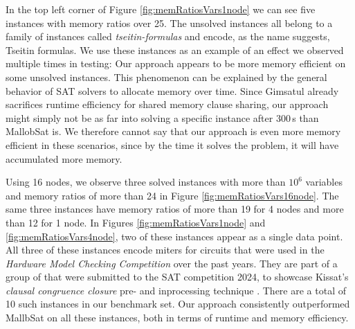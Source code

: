 \documentclass[12pt,a4paper,twoside]{scrartcl}
\numberwithin{equation}{section}
\begin{document}
In the top left corner of Figure \ref{fig:memRatiosVars1node} we can see five instances with memory ratios over 25. The unsolved instances all belong to a family of instances called \textit{tseitin-formulas} and encode, as the name suggests, Tseitin formulas. We use these instances as an example of an effect we observed multiple times in testing: Our approach appears to be more memory efficient on some unsolved instances. This phenomenon can be explained by the general behavior of SAT solvers to allocate memory over time. Since Gimsatul already sacrifices runtime efficiency for shared memory clause sharing, our approach might simply not be as far into solving a specific instance after $300\,$s than MallobSat is. We therefore cannot say that our approach is even more memory efficient in these scenarios, since by the time it solves the problem, it will have accumulated more memory.

Using 16 nodes, we observe three solved instances with more than $10^6$ variables and memory ratios of more than 24 in Figure \ref{fig:memRatiosVars16node}. The same three instances have memory ratios of more than 19 for 4 nodes and more than 12 for 1 node. In Figures \ref{fig:memRatiosVars1node} and \ref{fig:memRatiosVars4node}, two of these instances appear as a single data point. All three of these instances encode miters for circuits that were used in the \textit{Hardware Model Checking Competition} over the past years. They are part of a group of that were submitted to the SAT competition 2024, to showcase Kissat's \textit{clausal congruence closure} pre- and inprocessing technique \cite{satComp2024, biere2024clausal}. There are a total of 10 such instances in our benchmark set. Our approach consistently outperformed MallbSat on all these instances, both in terms of runtime and memory efficiency.
\end{document}
